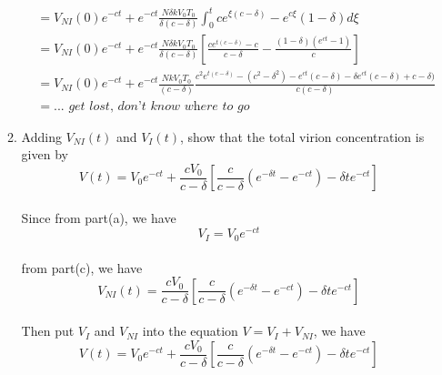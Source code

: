 \documentclass{article}
\begin{document}
\begin{enumerate}
\begin{enumerate}
\begin{align*}
						&= V_{NI}(0)e^{-ct} + e^{-ct}\frac{N\delta kV_0T_0}{\delta(c - \delta)}\int_0^{t}ce^{\xi(c - \delta)} - e^{c\xi}(1 - \delta)d\xi\\
						&= V_{NI}(0)e^{-ct} + e^{-ct}\frac{N\delta kV_0T_0}{\delta(c - \delta)}[\frac{ce^{t(c - \delta)} - c}{c - \delta} - \frac{(1 - \delta)(e^{ct} - 1)}{c}]\\
						&= V_{NI}(0)e^{-ct} + e^{-ct}\frac{NkV_0T_0}{(c - \delta)}\frac{c^2e^{t(c-\delta)} - (c^2 - \delta^2) - e^{ct}(c - \delta) - \delta e^{ct}(c - \delta) + c - \delta)}{c(c - \delta)}\\
						&= ... \textit{ get lost, don't know where to go}
		\end{align*}
		\item Adding $V_{NI}(t)$ and $V_I(t)$, show that the total virion concentration is given by
		\begin{equation*}
			V(t) = V_0e^{-ct} + \frac{cV_0}{c - \delta}[\frac{c}{c - \delta}(e^{-\delta t} - e^{-ct}) - \delta te^{-ct}]
		\end{equation*}
		\\ Since from part(a), we have 
		\begin{equation*}
		    V_I = V_0e^{-ct}
		\end{equation*}
		\\ from part(c), we have 
		\begin{equation*}
		    V_{NI}(t) = \frac{cV_0}{c - \delta}[\frac{c}{c - \delta}(e^{-\delta t} - e^{-ct})-\delta t e^{-ct}]
		\end{equation*}
		\\ Then put $V_I$ and $V_{NI}$ into the equation $V = V_I + V_{NI}$, we have
		\begin{equation*}
			V(t) = V_0e^{-ct} + \frac{cV_0}{c - \delta}[\frac{c}{c - \delta}(e^{-\delta t} - e^{-ct}) - \delta te^{-ct}]
		\end{equation*}
		\end{enumerate}
	\end{enumerate}
	
\end{document}
